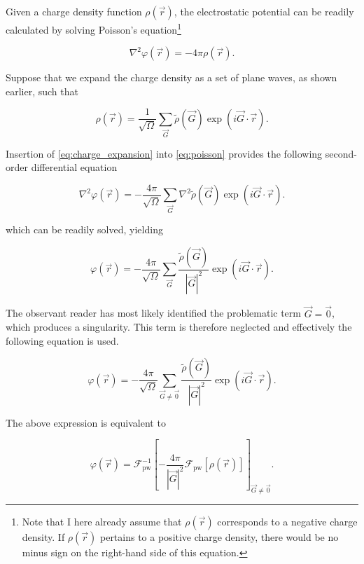 Given a charge density function $\rho(\vec{r})$, the electrostatic potential can be readily calculated by solving Poisson's equation\footnote{Note that I here already assume that $\rho(\vec{r})$ corresponds to a negative charge density. If $\rho(\vec{r})$ pertains to a positive charge density, there would be no minus sign on the right-hand side of this equation.}

\begin{equation}
    \nabla^{2} \varphi (\vec{r}) = -4\pi\rho(\vec{r}).
    \label{eq:poisson}
\end{equation}

Suppose that we expand the charge density as a set of plane waves, as shown earlier, such that

\begin{equation}
    \rho(\vec{r}) = \frac{1}{\sqrt{\Omega}} \sum_{\vec{G}} \tilde{\rho}(\vec{G}) \exp \left(i \vec{G} \cdot \vec{r} \right).
    \label{eq:charge_expansion}
\end{equation}

Insertion of \cref{eq:charge_expansion} into \cref{eq:poisson} provides the following second-order differential equation

\begin{equation}
    \nabla^{2} \varphi (\vec{r}) = -\frac{4\pi}{\sqrt{\Omega}} \sum_{\vec{G}} \nabla^{2} \tilde{\rho}(\vec{G}) \exp \left(i \vec{G} \cdot \vec{r} \right).
\end{equation}

which can be readily solved, yielding

\begin{equation}
    \varphi (\vec{r}) = -\frac{4\pi}{\sqrt{\Omega}} \sum_{\vec{G}} \frac{\tilde{\rho}(\vec{G})}{|\vec{G}|^{2}} \exp \left(i \vec{G} \cdot \vec{r} \right).
\end{equation}

The observant reader has most likely identified the problematic term $\vec{G} = \vec{0}$, which produces a singularity. This term is therefore neglected and effectively the following equation is used.

\begin{equation}
    \varphi (\vec{r}) = -\frac{4\pi}{\sqrt{\Omega}} \sum_{\vec{G} \neq \vec{0}} \frac{\tilde{\rho}(\vec{G})}{|\vec{G}|^{2}} \exp \left(i \vec{G} \cdot \vec{r} \right).
\end{equation}

The above expression is equivalent to

\begin{equation}
    \varphi (\vec{r}) = \mathcal{F}_{\text{pw}}^{-1} \left[-\frac{4 \pi}{|\vec{G}|^{2}} \mathcal{F}_{\text{pw}} \left[\rho(\vec{r}) \right] \right]_{\vec{G} \neq \vec{0}}.
    \label{eq:hartree-pot}
\end{equation}

